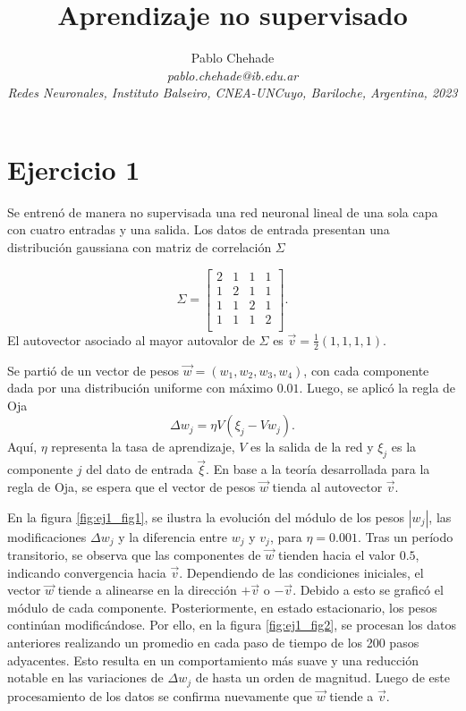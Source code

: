 \documentclass[aps,prb,twocolumn,superscriptaddress,floatfix,longbibliography]{revtex4-2}
\newcounter{para}
\begin{document}
\newcommand{\mytitle}{Aprendizaje no supervisado}

\title{\mytitle}

\author{Pablo Chehade \\
    \small \textit{pablo.chehade@ib.edu.ar} \\
    \small \textit{Redes Neuronales, Instituto Balseiro, CNEA-UNCuyo, Bariloche, Argentina, 2023} \\}
    
\maketitle




\section*{Ejercicio 1}


Se entrenó de manera no supervisada una red neuronal lineal de una sola capa con cuatro entradas y una salida. Los datos de entrada presentan una distribución gaussiana con matriz de correlación $\Sigma$



\[
\Sigma = \begin{bmatrix}
2 & 1 & 1 & 1 \\
1 & 2 & 1 & 1 \\
1 & 1 & 2 & 1 \\
1 & 1 & 1 & 2 \\
\end{bmatrix}
.
\]
El autovector asociado al mayor autovalor de $\Sigma$ es $\vec{v} = \frac{1}{2}(1, 1, 1, 1)$. 


Se partió de un vector de pesos $\vec{w} = (w_1, w_2, w_3, w_4)$, con cada componente dada por una distribución uniforme con máximo $0.01$. Luego, se aplicó la regla de Oja
\[
\Delta w_j = \eta V ( \xi_j - V w_j ).
\]
Aquí, $\eta$ representa la tasa de aprendizaje, $V$ es la salida de la red y $\xi_j$ es la componente $j$ del dato de entrada $\vec{\xi}$. En base a la teoría desarrollada para la regla de Oja, se espera que el vector de pesos $\vec{w}$ tienda al autovector $\vec{v}$.


En la figura \ref{fig:ej1_fig1}, se ilustra la evolución del módulo de los pesos $|w_j|$, las modificaciones $\Delta w_j$ y la diferencia entre $w_j$ y $v_j$, para $\eta = 0.001$. Tras un período transitorio, se observa que las componentes de $\vec{w}$ tienden hacia el valor $0.5$, indicando convergencia hacia $\vec{v}$. Dependiendo de las condiciones iniciales, el vector $\vec{w}$ tiende a alinearse en la dirección $+\vec{v}$ o $-\vec{v}$. Debido a esto se graficó el módulo de cada componente. Posteriormente, en estado estacionario, los pesos continúan modificándose. Por ello, en la figura \ref{fig:ej1_fig2}, se procesan los datos anteriores realizando un promedio en cada paso de tiempo de los 200 pasos adyacentes. Esto resulta en un comportamiento más suave y una reducción notable en las variaciones de $\Delta w_j$ de hasta un orden de magnitud. Luego de este procesamiento de los datos se confirma nuevamente que $\vec{w}$ tiende a $\vec{v}$.
\end{document}
